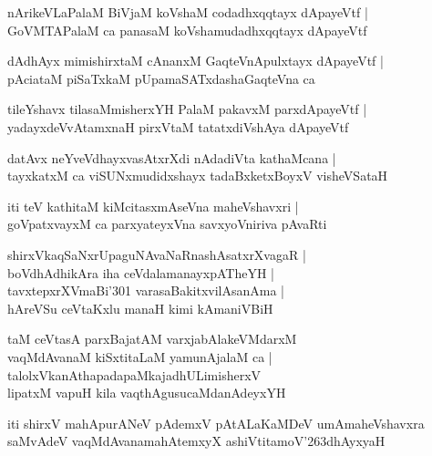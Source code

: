 \documentclass[twoside,12pt,openright]{book}
\def\S{\char'263}
\newcounter{shloka}[chapter]
\begin{document}
\begin{shloka}%
nArikeVLaPalaM BiVjaM koVshaM codadhxqqtayx dApayeVtf |\\
GoVMTAPalaM ca panasaM koVshamudadhxqqtayx dApayeVtf
\end{shloka}

\begin{shloka}%
dAdhAyx mimishirxtaM cAnanxM GaqteVnApulxtayx dApayeVtf |\\
pAciataM piSaTxkaM pUpamaSATxdashaGaqteVna ca 
\end{shloka}

\begin{shloka}%
tileYshavx tilasaMmisherxYH PalaM pakavxM parxdApayeVtf |\\
yadayxdeVvAtamxnaH pirxVtaM tatatxdiVshAya dApayeVtf
\end{shloka}

\begin{shloka}%
datAvx neYveVdhayxvasAtxrXdi nAdadiVta kathaMcana |\\
tayxkatxM ca viSUNxmudidxshayx tadaBxketxBoyxV visheVSataH 
\end{shloka}

\begin{shloka}%
iti teV kathitaM kiMcitasxmAseVna maheVshavxri |\\
goVpatxvayxM ca parxyateyxVna savxyoVniriva pAvaRti 
\end{shloka}

\begin{shloka}%
shirxVkaqSaNxrUpaguNAvaNaRnashAsatxrXvagaR |\\
boVdhAdhikAra iha ceVdalamanayxpATheYH |\\
tavxtepxrXVmaBi\char'301 varasaBakitxvilAsanAma |\\
hAreVSu ceVtaKxlu manaH kimi kAmaniVBiH
\end{shloka}

\begin{shloka}%
taM ceVtasA parxBajatAM varxjabAlakeVMdarxM \\
vaqMdAvanaM kiSxtitaLaM yamunAjalaM ca |\\
talolxVkanAthapadapaMkajadhULimisherxV \\
lipatxM vapuH kila vaqthAgusucaMdanAdeyxYH
\end{shloka}

\begin{center}
iti shirxV mahApurANeV pAdemxV pAtALaKaMDeV umAmaheVshavxra saMvAdeV vaqMdAvanamahAtemxyX  
ashiVtitamoV\S dhAyxyaH
\end{center}
\end{document}
